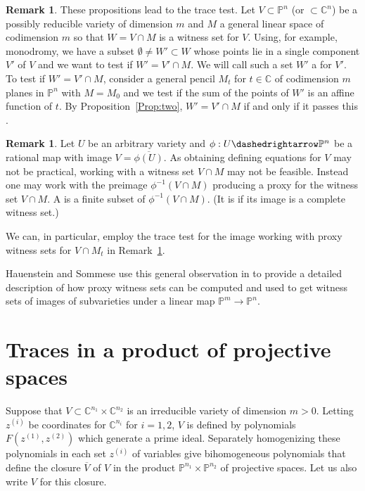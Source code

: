 \documentclass[12pt]{amsart}
\theoremstyle{definition}
\newtheorem{remark}[theorem]{Remark}
\begin{document}
\begin{remark}\label{remark:trace-test}
 These propositions lead to the trace test.
 Let $V\subset{{\mathbb{P}}}^n$ (or $\subset{{\mathbb{C}}}^n$) be a possibly reducible variety of dimension $m$ and $M$ a general
 linear space of codimension $m$ so that $W=V\cap M$ is a witness set for $V$.
 Using, for example, monodromy, we have a subset $\emptyset\neq W'\subset W$ whose points lie in a single
 component $V'$ of $V$ and we want to test if $W'=V'\cap M$.
 We will call such a set $W'$ a {{{}}} for $V'$.
 To test if $W'=V'\cap M$, consider a general pencil $M_t$ for $t\in{{\mathbb{C}}}$ of codimension $m$ planes in
 ${{\mathbb{P}}}^n$ with $M=M_0$ and we test if the sum of the points of $W'$ is an affine function of $t$.
 By Proposition~\ref{Prop:two}, $W'=V'\cap M$ if and only if it passes this {{{}}}.
\end{remark}

\begin{remark}\label{remark:trace-image}
 Let $U$ be an arbitrary variety and $\phi: U{\dashedrightarrow} {{\mathbb{P}}}^n$ be a rational map with image $V=\overline{\phi(U)}$.
 As obtaining defining equations for $V$ may not be practical, working with a witness set $V\cap M$ may not be feasible.
Instead one may work with the preimage $\phi^{-1}(V\cap M)$ producing a proxy for the witness set $V\cap M$. 
A {{{}}} is a finite subset of $\phi^{-1}(V\cap M)$. (It is {{{}}} if its image is a complete witness set.)

We can, in particular, employ the trace test for the image working with proxy witness sets for $V\cap M_t$ in Remark~\ref{remark:trace-test}.
\end{remark}

Hauenstein and Sommese use this general observation in \cite{WitnessProj} to provide a detailed description of how proxy witness sets can be computed and used to get witness sets of images of subvarieties under a linear map ${{\mathbb{P}}}^m \to {{\mathbb{P}}}^n$.

\section{Traces in a product of projective spaces}\label{S:product}

Suppose that $V\subset{{\mathbb{C}}}^{n_1}\times{{\mathbb{C}}}^{n_2}$ is an irreducible variety of dimension $m>0$.
Letting $z^{(i)}$ be coordinates for ${{\mathbb{C}}}^{n_i}$ for $i=1,2$, $V$ is defined by polynomials
$F(z^{(1)},z^{(2)})$ which generate a prime ideal.
Separately homogenizing these polynomials in each set $z^{(i)}$ of variables give bihomogeneous polynomials
that define the closure $\overline{V}$ of $V$ in the product ${{\mathbb{P}}}^{n_1}\times{{\mathbb{P}}}^{n_2}$ of projective spaces.
Let us also write $V$ for this closure.
\end{document}
